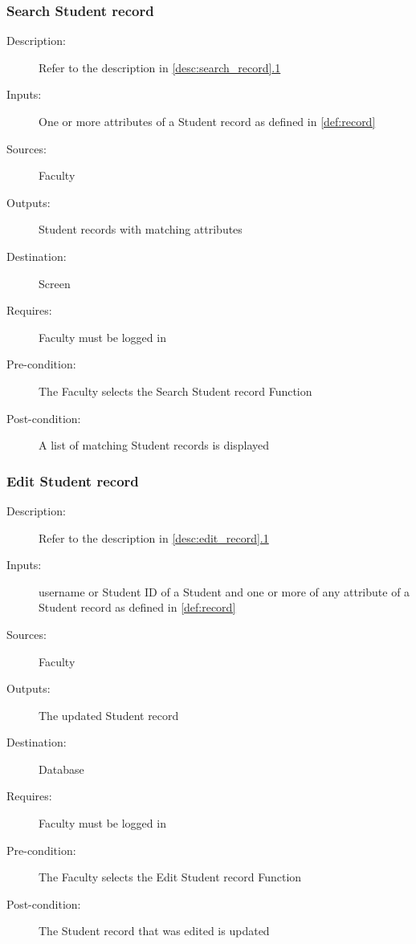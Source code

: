 \subsubsection{\large Search Student record} 
\begin{boxed} %
\begin{description}
\item[Description:]
   Refer to the description in \autoref{desc:search_record}\hyperref[desc:search_record]{.1}
\item[Inputs:]
   One or more attributes of a Student record as defined in \autoref{def:record}
\item[Sources:]
   Faculty
\item[Outputs:]
   Student records with matching attributes
\item[Destination:]
   Screen
\item[Requires:]
   Faculty must be logged in
\item[Pre-condition:]
   The Faculty selects the Search Student record Function
\item[Post-condition:]
   A list of matching Student records is displayed
\end{description}
\end{boxed} %

\subsubsection{\large Edit Student record} 
\begin{boxed} %
\begin{description}
\item[Description:]
   Refer to the description in \autoref{desc:edit_record}\hyperref[desc:edit_record]{.1}
\item[Inputs:]
   username or Student ID of a Student and one or more of any
   attribute of a Student record as defined in \autoref{def:record}
\item[Sources:]
   Faculty
\item[Outputs:]
   The updated Student record
\item[Destination:]
   Database
\item[Requires:]
   Faculty must be logged in
\item[Pre-condition:]
   The Faculty selects the Edit Student record Function
\item[Post-condition:]
   The Student record that was edited is updated
\end{description}
\end{boxed} %

